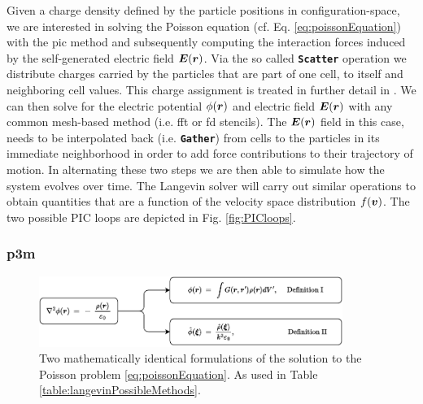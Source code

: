 Given a charge density defined by the particle positions in configuration-space, we are interested
in solving the Poisson equation (cf. Eq. \ref{eq:poissonEquation}) with the \gls{pic} method and subsequently computing the interaction forces 
induced by the self-generated electric field $\boldsymbol{E}(\boldsymbol{r})$.
Via the so called \textbf{\texttt{Scatter}} operation we distribute charges carried by
the particles that are part of one cell, to itself and neighboring cell values. This charge assignment is treated
in further detail in \cite{Hockney2021Chapter223}.
We can then solve for the electric potential $\phi(\boldsymbol{r})$ and electric field $\boldsymbol{E}(\boldsymbol{r})$ with any
common mesh-based method (i.e. \gls{fft} or \gls{fd} stencils).
The $\boldsymbol{E}(\boldsymbol{r})$ field in this case, needs to be interpolated back 
(i.e. \textbf{\texttt{Gather}}) from cells to the particles in its immediate neighborhood in order
to add force contributions to their trajectory of motion.
In alternating these two steps we are then able to simulate how the system evolves over time.
The Langevin solver will carry out similar operations to obtain quantities that are a function of
the velocity space distribution $f(\boldsymbol{v})$.
The two possible PIC loops are depicted in Fig. \ref{fig:PICloops}.


\subsubsection{\gls{p3m}}

\begin{figure}
    \begin{center}
        \includegraphics[width=0.88\textwidth]{figures/results/greenPoisson.pdf}
    \end{center}
    \caption{Two mathematically identical formulations of the solution to the Poisson problem
    \ref{eq:poissonEquation}. As used in Table \ref{table:langevinPossibleMethods}.}
    \label{fig:greenPoissonDefinitions}
\end{figure}

